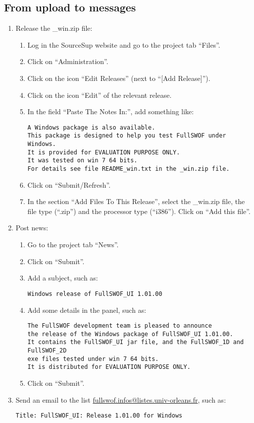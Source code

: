 \documentclass[a4paper, 11pt]{article}
\begin{document}
\subsection{From upload to messages}
\begin{enumerate}
\item Release the \_win.zip file:
\begin{enumerate}
\item Log in the SourceSup website and go to the project tab ``Files''.
\item Click on ``Administration''.
\item Click on the icon ``Edit Releases'' (next to ``[Add Release]'').
\item Click on the icon ``Edit'' of the relevant release.
\item In the field ``Paste The Notes In:'', add something like:
\begin{verbatim}
A Windows package is also available.
This package is designed to help you test FullSWOF under Windows.
It is provided for EVALUATION PURPOSE ONLY.
It was tested on win 7 64 bits.
For details see file README_win.txt in the _win.zip file.
\end{verbatim}
\item Click on ``Submit/Refresh''.
\item In the section ``Add Files To This Release'', select the \_win.zip file,
the file type (``.zip'') and the processor type  (``i386''). Click on ``Add this file''.
\end{enumerate}
\item Post news:
\begin{enumerate}
\item Go to the project tab ``News''.
\item Click on ``Submit''.
\item Add a subject, such as:
\begin{verbatim}
Windows release of FullSWOF_UI 1.01.00
\end{verbatim}
\item Add some details in the panel, such as:
\begin{verbatim}
The FullSWOF development team is pleased to announce
the release of the Windows package of FullSWOF_UI 1.01.00.
It contains the FullSWOF_UI jar file, and the FullSWOF_1D and FullSWOF_2D 
exe files tested under win 7 64 bits.
It is distributed for EVALUATION PURPOSE ONLY.
\end{verbatim}
\item Click on ``Submit''.
\end{enumerate}
\item Send an email to the list
\href{mailto:fullswof.infos@listes.univ-orleans.fr}{fullswof.infos@listes.univ-orleans.fr}, such as:
\begin{verbatim}
Title: FullSWOF_UI: Release 1.01.00 for Windows


\end{verbatim}
\end{enumerate}
\end{document}
